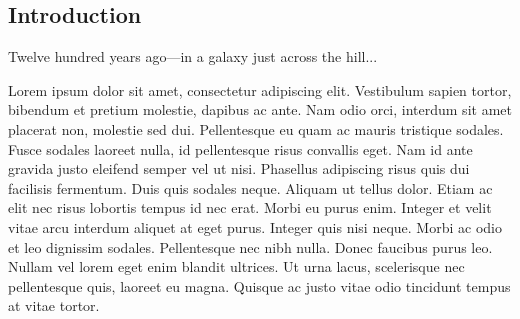 \documentclass[letterpaper,compsoc,twoside]{IEEEtran}
\begin{document}
\subsection{Introduction%
  \label{introduction}%
}


Twelve hundred years ago—in a galaxy just across the hill...

Lorem ipsum dolor sit amet, consectetur adipiscing elit. Vestibulum sapien
tortor, bibendum et pretium molestie, dapibus ac ante. Nam odio orci, interdum
sit amet placerat non, molestie sed dui. Pellentesque eu quam ac mauris
tristique sodales. Fusce sodales laoreet nulla, id pellentesque risus convallis
eget. Nam id ante gravida justo eleifend semper vel ut nisi. Phasellus
adipiscing risus quis dui facilisis fermentum. Duis quis sodales neque. Aliquam
ut tellus dolor. Etiam ac elit nec risus lobortis tempus id nec erat. Morbi eu
purus enim. Integer et velit vitae arcu interdum aliquet at eget purus. Integer
quis nisi neque. Morbi ac odio et leo dignissim sodales. Pellentesque nec nibh
nulla. Donec faucibus purus leo. Nullam vel lorem eget enim blandit ultrices.
Ut urna lacus, scelerisque nec pellentesque quis, laoreet eu magna. Quisque ac
justo vitae odio tincidunt tempus at vitae tortor.
\end{document}
